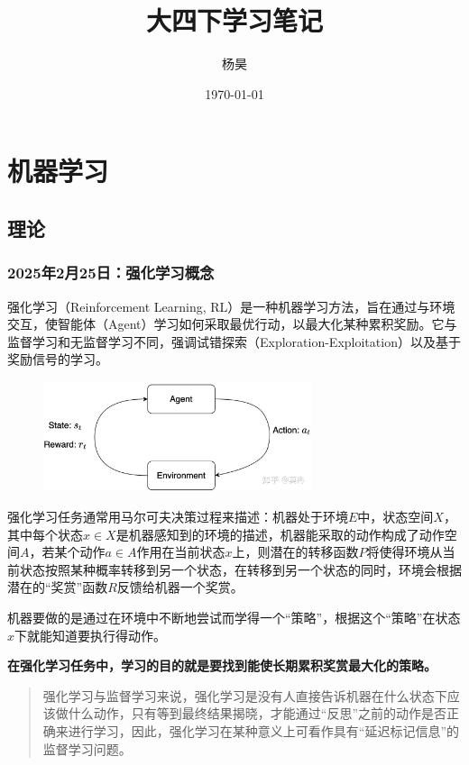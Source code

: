 \documentclass[12pt]{article}
\title{大四下学习笔记}
\author{杨昊}
\date{\today}
\begin{document}
\maketitle
\thispagestyle{empty}  %

\newpage
\tableofcontents


\newpage

\section{机器学习}


\subsection{理论}

\subsubsection{2025年2月25日：强化学习概念}
强化学习（Reinforcement Learning, RL）是一种机器学习方法，旨在通过与环境交互，使智能体（Agent）学习如何采取最优行动，以最大化某种累积奖励。它与监督学习和无监督学习不同，强调试错探索（Exploration-Exploitation）以及基于奖励信号的学习。
\begin{figure}[h]
    \centering
    \includegraphics[width=0.7\textwidth]{./images/rlimage.jpeg}  %
\end{figure}

强化学习任务通常用马尔可夫决策过程来描述：机器处于环境$E$中，状态空间$X$，其中每个状态$x \in X$是机器感知到的环境的描述，机器能采取的动作构成了动作空间$A$，若某个动作$a \in A$作用在当前状态$x$上，则潜在的转移函数$P$将使得环境从当前状态按照某种概率转移到另一个状态，在转移到另一个状态的同时，环境会根据潜在的“奖赏”函数$R$反馈给机器一个奖赏。

机器要做的是通过在环境中不断地尝试而学得一个“策略”，根据这个“策略”在状态$x$下就能知道要执行得动作。

\textbf{在强化学习任务中，学习的目的就是要找到能使长期累积奖赏最大化的策略。}
\begin{quote}
    强化学习与监督学习来说，强化学习是没有人直接告诉机器在什么状态下应该做什么动作，只有等到最终结果揭晓，才能通过“反思”之前的动作是否正确来进行学习，因此，强化学习在某种意义上可看作具有“延迟标记信息”的监督学习问题。
\end{quote}
\end{document}
